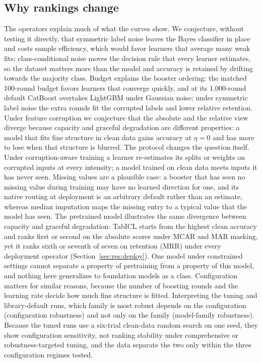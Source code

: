 \documentclass[pdflatex,sn-mathphys]{sn-jnl}
\theoremstyle{thmstyleone}
\theoremstyle{thmstyletwo}
\theoremstyle{thmstylethree}
\begin{document}
\subsection{Why rankings change}\label{sec:disc:why}

The operators explain much of what the curves show. We conjecture, without testing it directly, that symmetric label noise leaves the Bayes classifier in place and costs sample efficiency, which would favor learners that average many weak fits; class-conditional noise moves the decision rule that every learner estimates, so the dataset matters more than the model and accuracy is retained by drifting towards the majority class. Budget explains the booster ordering: the matched 100-round budget favors learners that converge quickly, and at its 1{,}000-round default CatBoost overtakes LightGBM under Gaussian noise; under symmetric label noise the extra rounds fit the corrupted labels and lower relative retention. Under feature corruption we conjecture that the absolute and the relative view diverge because capacity and graceful degradation are different properties: a model that fits fine structure in clean data gains accuracy at $\eta=0$ and has more to lose when that structure is blurred. The protocol changes the question itself. Under corruption-aware training a learner re-estimates its splits or weights on corrupted inputs at every intensity; a model trained on clean data meets inputs it has never seen. Missing values are a plausible case: a booster that has seen no missing value during training may have no learned direction for one, and its native routing at deployment is an arbitrary default rather than an estimate, whereas median imputation maps the missing entry to a typical value that the model has seen. The pretrained model illustrates the same divergence between capacity and graceful degradation: TabICL starts from the highest clean accuracy and ranks first or second on the absolute scores under MCAR and MAR masking, yet it ranks sixth or seventh of seven on retention (MRR) under every deployment operator (Section~\ref{sec:res:deploy}). One model under constrained settings cannot separate a property of pretraining from a property of this model, and nothing here generalizes to foundation models as a class. Configuration matters for similar reasons, because the number of boosting rounds and the learning rate decide how much fine structure is fitted. Interpreting the tuning and library-default runs, which family is most robust depends on the configuration (configuration robustness) and not only on the family (model-family robustness). Because the tuned runs use a six-trial clean-data random search on one seed, they show configuration sensitivity, not ranking stability under comprehensive or robustness-targeted tuning, and the data separate the two only within the three configuration regimes tested.
\end{document}
